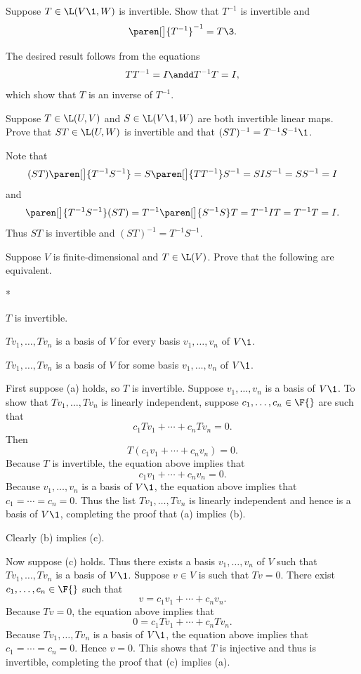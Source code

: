 
\exercise
Suppose $T \in \L(V\1, W)$ is invertible. Show that $T^{-1}$ is invertible and
\[
\paren[\big]{ T^{-1} }^{-1} = T\3.
\]
\exercisedisplayend

\begin{Solution}
The desired result follows from the equations
\[
TT^{-1} = I \andd T^{-1}T = I,
\]
which show that $T$ is an inverse of $T^{-1}$.
\end{Solution}

\exercise
Suppose $T \in \L(U, V)$ and $S \in \L(V\1,W)$ are both invertible linear maps. Prove that $ST \in \L(U, W)$ is invertible and that $(ST)^{-1} = T^{-1} S^{-1}\1$.

\begin{Solution}
Note that
\[
(ST)\paren[\big]{T^{-1} S^{-1}} = S\paren[\big]{ T T^{-1}} S^{-1} = S I S^{-1} = S S^{-1} = I
\]
and
\[
\paren[\big]{T^{-1} S^{-1}}(ST) = T^{-1} \paren[\big]{S^{-1} S}T = T^{-1} I T = T^{-1} T = I.
\]
Thus $ST$ is invertible and $(ST)^{-1} = T^{-1} S^{-1}$.
\end{Solution}

\exercise
Suppose $V$ is finite-dimensional and $T \in \L(V)$. Prove that the following are equivalent.
\begin{subtheorem}*
\item
$T$ is invertible.
\item
$Tv_1, \ldots, Tv_n$ is a basis of $V$ for every basis $v_1, \ldots, v_n$ of $V\1$.
\item
$Tv_1, \ldots, Tv_n$ is a basis of $V$ for some basis $v_1, \ldots, v_n$ of $V\1$.
\end{subtheorem}
\exercisesubtheoremend

\begin{Solution}
First suppose (a) holds, so $T$ is invertible. Suppose $v_1, \ldots, v_n$ is a basis of $V\1$. To show that $Tv_1, \ldots, Tv_n$ is linearly independent, suppose $c_1, \ldots, c_n \in \F{}$ are such that
\[
c_1 Tv_1 + \cdots + c_n Tv_n = 0.
\]
Then
\[
T(c_1 v_1 + \cdots + c_n v_n) = 0.
\]
Because $T$ is invertible, the equation above implies that
\[
c_1  v_1 +  \cdots + c_n v_n = 0.
\]
Because $v_1, \ldots, v_n$ is a basis of $V\1$, the equation above implies that $c_1 = \cdots = c_n = 0$. Thus the list
$Tv_1, \ldots, Tv_n$ is linearly independent and hence is a basis of $V\1$, completing the proof that (a) implies (b).

Clearly (b) implies (c).

Now suppose (c) holds. Thus there exists a basis $v_1, \ldots, v_n$ of $V$ such that $Tv_1, \ldots, Tv_n$ is a basis of $V\1$. Suppose $v \in V$ is such that $Tv = 0$. There exist $c_1, \ldots, c_n \in \F{}$ such that
\[
v = c_1v_1 +  \cdots + c_n v_n.
\]
Because $Tv = 0$, the equation above implies that
\[
0 = c_1 Tv_1 + \cdots + c_n Tv_n.
\]
Because $Tv_1, \ldots, Tv_n$ is a basis of $V\1$, the equation above implies that $c_1 = \cdots = c_n = 0$. Hence $v = 0$. This shows that $T$ is injective and thus is invertible, completing the proof that (c) implies (a).
\end{Solution}

